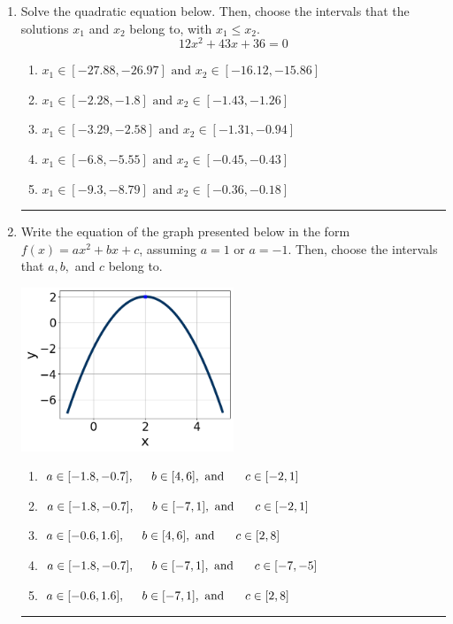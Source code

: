 \documentclass[14pt]{extbook}
\newcommand{\litem}[1]{\item#1\hspace*{-1cm}\rule{\textwidth}{0.4pt}}
\begin{document}
\begin{enumerate}
{\begin{enumerate}[label=\Alph*.]
\end{enumerate} }
\litem{
Solve the quadratic equation below. Then, choose the intervals that the solutions $x_1$ and $x_2$ belong to, with $x_1 \leq x_2$.\[ 12x^{2} +43 x + 36 = 0 \]\begin{enumerate}[label=\Alph*.]
\item \( x_1 \in [-27.88, -26.97] \text{ and } x_2 \in [-16.12, -15.86] \)
\item \( x_1 \in [-2.28, -1.8] \text{ and } x_2 \in [-1.43, -1.26] \)
\item \( x_1 \in [-3.29, -2.58] \text{ and } x_2 \in [-1.31, -0.94] \)
\item \( x_1 \in [-6.8, -5.55] \text{ and } x_2 \in [-0.45, -0.43] \)
\item \( x_1 \in [-9.3, -8.79] \text{ and } x_2 \in [-0.36, -0.18] \)

\end{enumerate} }
\litem{
Write the equation of the graph presented below in the form $f(x)=ax^2+bx+c$, assuming  $a=1$ or $a=-1$. Then, choose the intervals that $a, b,$ and $c$ belong to.
\begin{center}
    \includegraphics[width=0.5\textwidth]{../Figures/quadraticGraphToEquationA.png}
\end{center}
\begin{enumerate}[label=\Alph*.]
\item \( a \in [-1.8, -0.7], \hspace*{5mm} b \in [4, 6], \text{ and } \hspace*{5mm} c \in [-2, 1] \)
\item \( a \in [-1.8, -0.7], \hspace*{5mm} b \in [-7, 1], \text{ and } \hspace*{5mm} c \in [-2, 1] \)
\item \( a \in [-0.6, 1.6], \hspace*{5mm} b \in [4, 6], \text{ and } \hspace*{5mm} c \in [2, 8] \)
\item \( a \in [-1.8, -0.7], \hspace*{5mm} b \in [-7, 1], \text{ and } \hspace*{5mm} c \in [-7, -5] \)
\item \( a \in [-0.6, 1.6], \hspace*{5mm} b \in [-7, 1], \text{ and } \hspace*{5mm} c \in [2, 8] \)


\end{enumerate}}
\end{enumerate}
\end{document}
